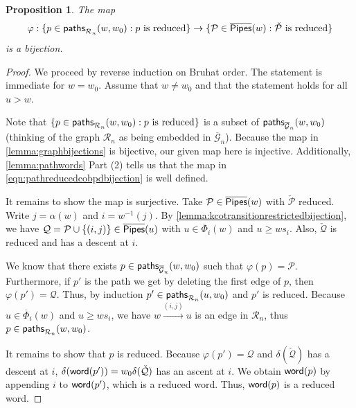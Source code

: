 \documentclass[12 pt]{amsart}
\newcommand{\paths}{{\sf paths}}
\newcommand{\word}{{\sf word}}
\newcommand{\addable}{\alpha}
\newtheorem{proposition}[Theorem]{Proposition}
\numberwithin{equation}{section}
\theoremstyle{remark}
\newcommand{\kpipes}{\overline{\sf Pipes}}
\newcommand{\demprod}{\delta}
\newcommand{\kcotransitionperms}{\overline{\Phi}}
\begin{document}
		\begin{proposition}
			\label{thm:pathreducedcopdbijection}
The map 
\begin{equation}
	\label{eqn:pathreducedcobpdbijection}
\varphi:\{p \in \paths_{\mathcal{R}_n}(w,w_0): p \text{ is reduced}\} \rightarrow \{\mathcal{P} \in \kpipes(w):\check{\mathcal{P}} \text{ is reduced}\}
\end{equation}
 is a bijection.
		\end{proposition}
		\begin{proof}
			
We proceed by reverse induction on Bruhat order. 
The statement is immediate for $w=w_0$. Assume that $w\neq w_0$ and that the statement holds for all $u>w$.
			
Note that $\{p\in\paths_{\mathcal{R}_n}(w,w_0): p \text{ is reduced}\}$ is a subset of $\paths_{\overline{\mathcal{G}}_n}(w,w_0)$ (thinking of the graph $\mathcal{R}_n$ as being embedded in $\overline{\mathcal{G}}_n$). Because the map in \cref{lemma:graphbijections} is bijective, our given map here is injective. Additionally, \cref{lemma:pathwords} Part (2) tells us that the map in \cref{eqn:pathreducedcobpdbijection} is well defined. 

It remains to show the map is surjective. 
Take $\mathcal{P}\in \kpipes(w)$ with $\check{\mathcal{P}}$ reduced. 
Write $j=\addable(w)$ and $i=w^{-1}(j)$.
By \cref{lemma:kcotransitionrestrictedbijection}, we have $\mathcal Q=\mathcal{P}\cup\{(i,j)\}\in \kpipes(u)$ with $u\in \kcotransitionperms_{i}(w)$ and $u\geq ws_i$. Also, $\check{\mathcal Q}$ is reduced and has a descent at $i$.

We know that there exists $p\in \paths_{\overline{\mathcal{G}}_n}(w,w_0)$ such that $\varphi(p)=\mathcal{P}$. Furthermore, if $p'$ is the path we get by deleting the first edge of $p$, then $\varphi(p')=\mathcal{Q}$. Thus, by induction $p'\in \paths_{\mathcal{R}_n}(u,w_0)$ and $p'$ is reduced. Because $u\in \kcotransitionperms_{i}(w)$ and $u\geq ws_i$, we have $w\xrightarrow{(i,j)}u$ is an edge in $\mathcal{R}_n$, thus $p\in \paths_{\mathcal{R}_n}(w,w_0)$.

It remains to show that $p$ is reduced. Because $\varphi(p')=\mathcal{Q}$ and $\demprod(\check{\mathcal{Q}})$ has a descent at $i$, $\demprod(\word(p'))=w_0\demprod(\check{\mathcal{Q}})$ has an ascent at $i$. 
We obtain $\word(p)$ by appending $i$ to $\word(p')$, which is a reduced word.
Thus, $\word(p)$ is a reduced word.
\end{proof}
		
\end{document}

